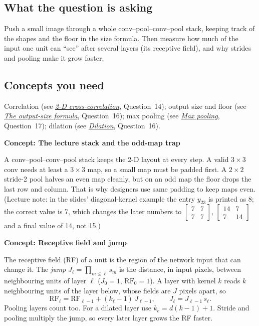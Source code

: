 \documentclass[12pt,a4paper]{article}
\newcommand{\concept}[2]{\par\medskip\phantomsection\label{#1}{\large\bfseries\color{blue!50!black} Concept: #2}\par}
\newcommand{\seeconcept}[3]{(see \hyperref[#1]{\textit{#2}}, Question~#3)}
\begin{document}
\subsection*{What the question is asking}
Push a small image through a whole conv--pool--conv--pool stack, keeping track of the shapes and the floor in the size formula. Then measure how much of the input one unit can ``see'' after several layers (its receptive field), and why strides and pooling make it grow faster.

\subsection*{Concepts you need}
Correlation \seeconcept{c:corr2d}{2-D cross-correlation}{14}; output size and floor \seeconcept{c:outsize}{The output-size formula}{16}; max pooling \seeconcept{c:maxpool}{Max pooling}{17}; dilation \seeconcept{c:dilation}{Dilation}{16}.

\concept{c:stack}{The lecture stack and the odd-map trap}
A conv--pool--conv--pool stack keeps the 2-D layout at every step. A valid $3\times3$ conv needs at least a $3\times3$ map, so a small map must be padded first. A $2\times2$ stride-2 pool halves an even map cleanly, but on an odd map the floor drops the last row and column. That is why designers use same padding to keep maps even. (Lecture note: in the slides' diagonal-kernel example the entry $y_{23}$ is printed as 8; the correct value is 7, which changes the later numbers to $\begin{bmatrix}7&7\\7&7\end{bmatrix}$, $\begin{bmatrix}14&7\\7&14\end{bmatrix}$ and a final value of 14, not 15.)

\concept{c:rf}{Receptive field and jump}
The receptive field (RF) of a unit is the region of the network input that can change it. The \emph{jump} $J_\ell=\prod_{m\le\ell}s_m$ is the distance, in input pixels, between neighbouring units of layer $\ell$ ($J_0=1$, $\mathrm{RF}_0=1$). A layer with kernel $k$ reads $k$ neighbouring units of the layer below, whose fields are $J$ pixels apart, so
\[
\mathrm{RF}_\ell=\mathrm{RF}_{\ell-1}+(k_\ell-1)\,J_{\ell-1},\qquad J_\ell=J_{\ell-1}\,s_\ell .
\]
Pooling layers count too. For a dilated layer use $k_e=d(k-1)+1$. Stride and pooling multiply the jump, so every later layer grows the RF faster.
\end{document}
